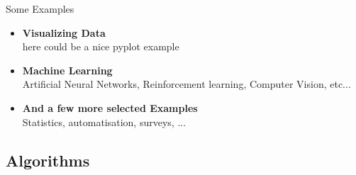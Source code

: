 \begin{frame}{Some Examples}

    \begin{itemize}
        \item <2-> \textbf{Visualizing Data} \\
        here could be a nice pyplot example

        \item <3-> \textbf{Machine Learning} \\
        Artificial Neural Networks, Reinforcement learning, Computer Vision, etc...

        \item <4-> \textbf{And a few more selected Examples} \\
        Statistics, automatisation, surveys, ...
    \end{itemize}

    \pause

    \vspace{0.5cm}


    \vspace{0.5cm}


\end{frame}

\subsection{Algorithms}

